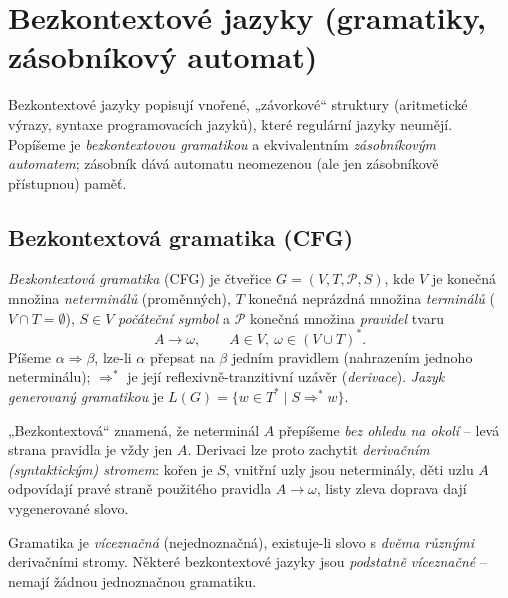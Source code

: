 \documentclass[11pt,a4paper]{article}
\begin{document}
\section{Bezkontextové jazyky (gramatiky, zásobníkový automat)}

Bezkontextové jazyky popisují vnořené, „závorkové`` struktury (aritmetické výrazy, syntaxe programovacích jazyků), které regulární jazyky neumějí. Popíšeme je \emph{bezkontextovou gramatikou} a ekvivalentním \emph{zásobníkovým automatem}; zásobník dává automatu neomezenou (ale jen zásobníkově přístupnou) paměť.

\subsection{Bezkontextová gramatika (CFG)}

\begin{definice}
\emph{Bezkontextová gramatika} (CFG) je čtveřice $G=(V,T,\mathcal P,S)$, kde $V$ je konečná množina \emph{neterminálů} (proměnných), $T$ konečná neprázdná množina \emph{terminálů} ($V\cap T=\emptyset$), $S\in V$ \emph{počáteční symbol} a $\mathcal P$ konečná množina \emph{pravidel} tvaru
\[ A\to\omega,\qquad A\in V,\ \omega\in(V\cup T)^*. \]
Píšeme $\alpha\Rightarrow\beta$, lze-li $\alpha$ přepsat na $\beta$ jedním pravidlem (nahrazením jednoho neterminálu); $\Rightarrow^*$ je její reflexivně-tranzitivní uzávěr (\emph{derivace}). \emph{Jazyk generovaný gramatikou} je $L(G)=\{w\in T^*\mid S\Rightarrow^* w\}$.
\end{definice}

\begin{intuice}
„Bezkontextová`` znamená, že neterminál $A$ přepíšeme \emph{bez ohledu na okolí} -- levá strana pravidla je vždy jen $A$. Derivaci lze proto zachytit \emph{derivačním (syntaktickým) stromem}: kořen je $S$, vnitřní uzly jsou neterminály, děti uzlu $A$ odpovídají pravé straně použitého pravidla $A\to\omega$, listy zleva doprava dají vygenerované slovo.
\end{intuice}

\begin{definice}[Víceznačnost]
Gramatika je \emph{víceznačná} (nejednoznačná), existuje-li slovo s \emph{dvěma různými} derivačními stromy. Některé bezkontextové jazyky jsou \emph{podstatně víceznačné} -- nemají žádnou jednoznačnou gramatiku.
\end{definice}
\end{document}
